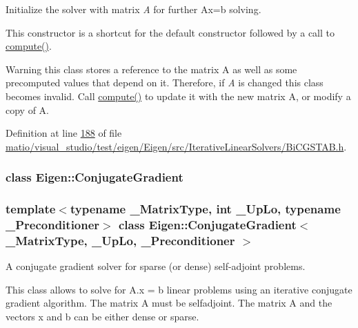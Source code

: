 Initialize the solver with matrix {\itshape A} for further {\ttfamily Ax=b} solving.

This constructor is a shortcut for the default constructor followed by a call to \hyperlink{group___iterative_linear_solvers___module_a7dfa55c55e82d697bde227696a630914}{compute()}.

\begin{DoxyWarning}{Warning}
this class stores a reference to the matrix A as well as some precomputed values that depend on it. Therefore, if {\itshape A} is changed this class becomes invalid. Call \hyperlink{group___iterative_linear_solvers___module_a7dfa55c55e82d697bde227696a630914}{compute()} to update it with the new matrix A, or modify a copy of A. 
\end{DoxyWarning}


Definition at line \hyperlink{matio_2visual__studio_2test_2eigen_2_eigen_2src_2_iterative_linear_solvers_2_bi_c_g_s_t_a_b_8h_source_l00188}{188} of file \hyperlink{matio_2visual__studio_2test_2eigen_2_eigen_2src_2_iterative_linear_solvers_2_bi_c_g_s_t_a_b_8h_source}{matio/visual\+\_\+studio/test/eigen/\+Eigen/src/\+Iterative\+Linear\+Solvers/\+Bi\+C\+G\+S\+T\+A\+B.\+h}.

\label{class_eigen_1_1_conjugate_gradient}
\subsubsection{class Eigen\+:\+:Conjugate\+Gradient}
\subsubsection*{template$<$typename \+\_\+\+Matrix\+Type, int \+\_\+\+Up\+Lo, typename \+\_\+\+Preconditioner$>$\newline
class Eigen\+::\+Conjugate\+Gradient$<$ \+\_\+\+Matrix\+Type, \+\_\+\+Up\+Lo, \+\_\+\+Preconditioner $>$}

A conjugate gradient solver for sparse (or dense) self-\/adjoint problems. 

This class allows to solve for A.\+x = b linear problems using an iterative conjugate gradient algorithm. The matrix A must be selfadjoint. The matrix A and the vectors x and b can be either dense or sparse.


